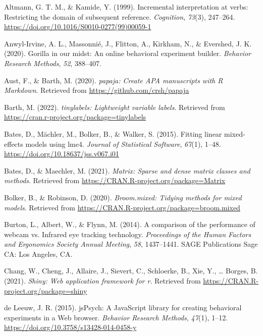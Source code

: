 \documentclass[
  man,floatsintext]{apa6}
\newlength{\cslhangindent}
\newenvironment{CSLReferences}[2] %
 {\begin{list}{}{%
  \setlength{\itemindent}{0pt}
  \setlength{\leftmargin}{0pt}
  \setlength{\parsep}{0pt}
  \ifodd #1
   \setlength{\leftmargin}{\cslhangindent}
   \setlength{\itemindent}{-1\cslhangindent}
  \fi
  \setlength{\itemsep}{#2\baselineskip}}}
 {\end{list}}
\begin{document}
\label{refs}
\begin{CSLReferences}{1}{0}
Altmann, G. T. M., \& Kamide, Y. (1999). Incremental interpretation at verbs: Restricting the domain of subsequent reference. \emph{Cognition}, \emph{73}(3), 247--264. \url{https://doi.org/10.1016/S0010-0277(99)00059-1}

Anwyl-Irvine, A. L., Massonnié, J., Flitton, A., Kirkham, N., \& Evershed, J. K. (2020). Gorilla in our midst: An online behavioral experiment builder. \emph{Behavior Research Methods}, \emph{52}, 388--407.

Aust, F., \& Barth, M. (2020). \emph{{papaja}: {Create} {APA} manuscripts with {R Markdown}}. Retrieved from \url{https://github.com/crsh/papaja}

Barth, M. (2022). \emph{{tinylabels}: Lightweight variable labels}. Retrieved from \url{https://cran.r-project.org/package=tinylabels}

Bates, D., Mächler, M., Bolker, B., \& Walker, S. (2015). Fitting linear mixed-effects models using {lme4}. \emph{Journal of Statistical Software}, \emph{67}(1), 1--48. \url{https://doi.org/10.18637/jss.v067.i01}

Bates, D., \& Maechler, M. (2021). \emph{Matrix: Sparse and dense matrix classes and methods}. Retrieved from \url{https://CRAN.R-project.org/package=Matrix}

Bolker, B., \& Robinson, D. (2020). \emph{Broom.mixed: Tidying methods for mixed models}. Retrieved from \url{https://CRAN.R-project.org/package=broom.mixed}

Burton, L., Albert, W., \& Flynn, M. (2014). A comparison of the performance of webcam vs. Infrared eye tracking technology. \emph{Proceedings of the Human Factors and Ergonomics Society Annual Meeting}, \emph{58}, 1437--1441. SAGE Publications Sage CA: Los Angeles, CA.

Chang, W., Cheng, J., Allaire, J., Sievert, C., Schloerke, B., Xie, Y., \ldots{} Borges, B. (2021). \emph{Shiny: Web application framework for r}. Retrieved from \url{https://CRAN.R-project.org/package=shiny}

de Leeuw, J. R. (2015). {jsPsych}: {A JavaScript} library for creating behavioral experiments in a {Web} browser. \emph{Behavior Research Methods}, \emph{47}(1), 1--12. \url{https://doi.org/10.3758/s13428-014-0458-y}


\end{CSLReferences}
\end{document}
